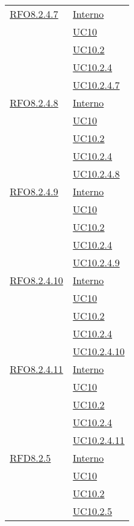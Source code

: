 \begin{longtable}{|>{\centering}m{5cm}|m{5cm}<{\centering}|}
 \hyperlink{RFO8.2.4.7}{RFO8.2.4.7} 
 & \hyperlink{Interno}{Interno}\\
 & \hyperref[UC10]{UC10}\\
 & \hyperref[UC10.2]{UC10.2}\\
 & \hyperref[UC10.2.4]{UC10.2.4}\\
 & \hyperref[UC10.2.4.7]{UC10.2.4.7}\\\hline
 
 \hyperlink{RFO8.2.4.8}{RFO8.2.4.8} 
 & \hyperlink{Interno}{Interno}\\
 & \hyperref[UC10]{UC10}\\
 & \hyperref[UC10.2]{UC10.2}\\
 & \hyperref[UC10.2.4]{UC10.2.4}\\
 & \hyperref[UC10.2.4.8]{UC10.2.4.8}\\\hline
 
 \hyperlink{RFO8.2.4.9}{RFO8.2.4.9} 
 & \hyperlink{Interno}{Interno}\\
 & \hyperref[UC10]{UC10}\\
 & \hyperref[UC10.2]{UC10.2}\\
 & \hyperref[UC10.2.4]{UC10.2.4}\\
 & \hyperref[UC10.2.4.9]{UC10.2.4.9}\\\hline
 
 \hyperlink{RFO8.2.4.10}{RFO8.2.4.10} 
 & \hyperlink{Interno}{Interno}\\
 & \hyperref[UC10]{UC10}\\
 & \hyperref[UC10.2]{UC10.2}\\
 & \hyperref[UC10.2.4]{UC10.2.4}\\
 & \hyperref[UC10.2.4.10]{UC10.2.4.10}\\\hline
 
 \hyperlink{RFO8.2.4.11}{RFO8.2.4.11} 
 & \hyperlink{Interno}{Interno}\\
 & \hyperref[UC10]{UC10}\\
 & \hyperref[UC10.2]{UC10.2}\\
 & \hyperref[UC10.2.4]{UC10.2.4}\\
 & \hyperref[UC10.2.4.11]{UC10.2.4.11}\\\hline 
  
 \hyperlink{RFD8.2.5}{RFD8.2.5} 
 & \hyperlink{Interno}{Interno}\\
 & \hyperref[UC10]{UC10}\\
 & \hyperref[UC10.2]{UC10.2}\\
 & \hyperref[UC10.2.5]{UC10.2.5}\\\hline
 

\end{longtable}
